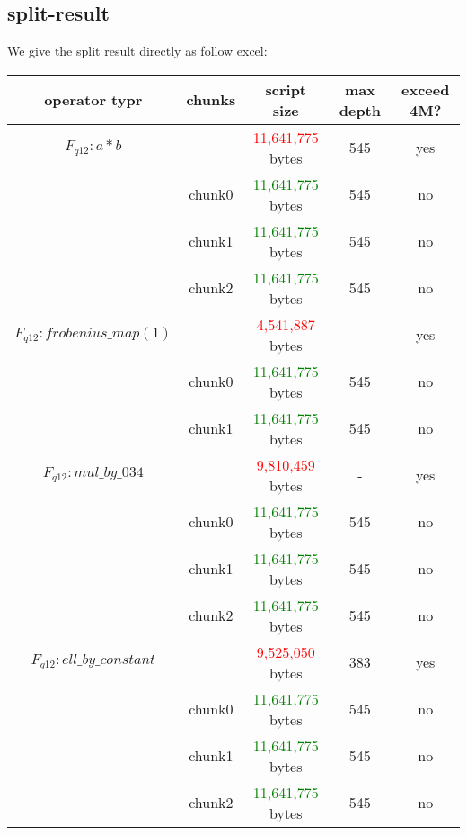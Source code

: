 \subsection{split-result}

We give the split result directly as follow excel:

\begin{tabular}{|c|c|c|c|c|} \hline
    operator typr & chunks & script size & max depth & exceed 4M? \\ \hline
    $F_{q12}: a * b$ & & \textcolor{red}{11,641,775} bytes & 545 & yes \\ \hline
     & chunk0 & \textcolor{green}{11,641,775} bytes & 545 & no \\ \hline
     & chunk1 & \textcolor{green}{11,641,775} bytes & 545 & no \\ \hline
     & chunk2 & \textcolor{green}{11,641,775} bytes & 545 & no \\ \hline
    $F_{q12}: frobenius\_map(1)$ & & \textcolor{red}{4,541,887} bytes & - & yes \\ \hline
    & chunk0 & \textcolor{green}{11,641,775} bytes & 545 & no \\ \hline
    & chunk1 & \textcolor{green}{11,641,775} bytes & 545 & no \\ \hline
    $F_{q12}: mul\_by\_034$ & & \textcolor{red}{9,810,459} bytes & - & yes \\ \hline
    & chunk0 & \textcolor{green}{11,641,775} bytes & 545 & no \\ \hline
    & chunk1 & \textcolor{green}{11,641,775} bytes & 545 & no \\ \hline
    & chunk2 & \textcolor{green}{11,641,775} bytes & 545 & no \\ \hline
    $F_{q12}: ell\_by\_constant$ & & \textcolor{red}{9,525,050} bytes & 383 & yes \\ \hline
    & chunk0 & \textcolor{green}{11,641,775} bytes & 545 & no \\ \hline
    & chunk1 & \textcolor{green}{11,641,775} bytes & 545 & no \\ \hline
    & chunk2 & \textcolor{green}{11,641,775} bytes & 545 & no \\ \hline
\end{tabular}